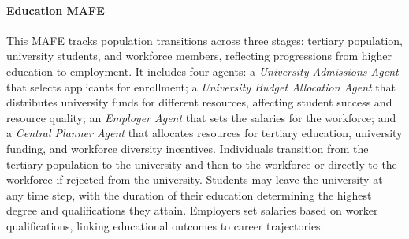 \paragraph{Education MAFE} 
This MAFE tracks population transitions across three stages: tertiary population, university students, and workforce members, reflecting progressions from higher education to employment. It includes four agents: a \textit{University Admissions Agent} that selects applicants for enrollment; a \textit{University Budget Allocation Agent} that distributes university funds for different resources, affecting student success and resource quality; an \textit{Employer Agent} that sets the salaries for the workforce; and a \textit{Central Planner Agent} that allocates resources for tertiary education, university funding, and workforce diversity incentives. Individuals transition from the tertiary population to the university and then to the workforce or directly to the workforce if rejected from the university. Students may leave the university at any time step, with the duration of their education determining the highest degree and qualifications they attain. Employers set salaries based on worker qualifications, linking educational outcomes to career trajectories.
